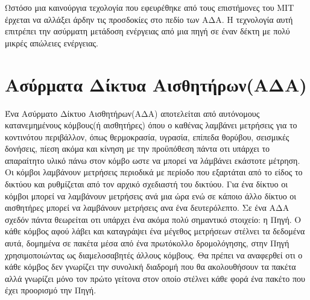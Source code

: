 Ωστόσο μια καινούργια τεχολογία που εφευρέθηκε από τους επιστήμονες του MIT \cite{power_mit_1} έρχεται να αλλάξει άρδην τις προσδοκίες στο πεδίο των ΑΔΑ. Η τεχνολογία
αυτή επιτρέπει την ασύρματη μετάδοση ενέργειας από μια πηγή σε έναν δέκτη με πολύ μικρές απώλειες ενέργειας. 






\section{Ασύρματα Δίκτυα Αισθητήρων(ΑΔΑ)}
Ένα Ασύρματο Δίκτυο Αισθητήρων(ΑΔΑ) αποτελείται από αυτόνομους κατανεμημένους κόμβους(ή αισθητήρες) όπου ο καθένας λαμβάνει μετρήσεις για το κοντινότου περιβάλλον,
όπως θερμοκρασία, υγρασία, επίπεδα θορύβου, σεισμικές δονήσεις, πίεση ακόμα και κίνηση με την προϋπόθεση πάντα οτι υπάρχει το απαραίτητο υλικό πάνω στον κόμβο ωστε
να μπορεί να λάμβάνει εκάστοτε μέτρηση.
Οι κόμβοι λαμβάνουν μετρήσεις περιοδικά με περίοδο που εξαρτάται από το είδος το δικτύου και ρυθμίζεται από τον αρχικό σχεδιαστή του δικτύου.
Για ένα δίκτυο οι κόμβοι μπορεί να λαμβάνουν μετρήσεις ανά μια ώρα ενώ σε κάποιο άλλο δίκτυο οι αισθητήρες μπορεί να λαμβάνουν μετρήσεις ανα ένα δευτερόλεπτο.
Σε ένα ΑΔΑ σχεδόν πάντα θεωρείται οτι υπάρχει ένα ακόμα πολύ σημαντικό στοιχείο: η Πηγή.
Ο κάθε κόμβος αφού λάβει και καταγράψει ένα μέγεθος μετρήσεων στέλνει τα δεδομένα αυτά, δομημένα σε πακέτα μέσα από ένα πρωτόκολλο δρομολόγησης, στην Πηγή
χρησιμοποιώντας ως διαμελοσαβητές άλλους κόμβους.
Θα πρέπει να αναφερθεί οτι ο κάθε κόμβος δεν γνωρίζει την συνολική διαδρομή που θα ακολουθήσουν τα πακέτα αλλά γνωρίζει μόνο τον πρώτο γείτονα στον οποίο στέλνει κάθε
φορά ένα πακέτο που έχει προορισμό την Πηγή. 

